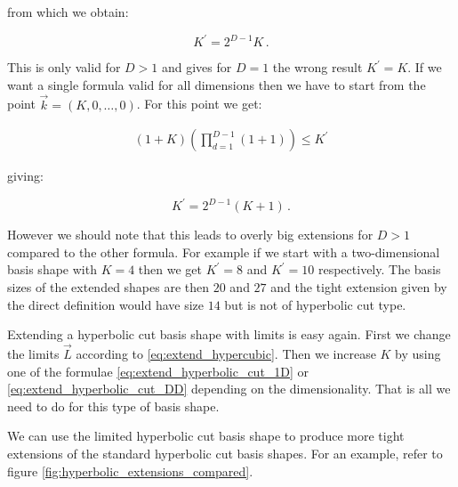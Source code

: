 from which we obtain:

\begin{equation} \label{eq:extend_hyperbolic_cut_DD}
  K^\prime = 2^{D-1} K \,.
\end{equation}

This is only valid for $D>1$ and gives for $D=1$ the wrong result $K^\prime = K$.
If we want a single formula valid for all dimensions then we have to start from
the point $\vec{k} = (K, 0, \ldots, 0)$. For this point we get:

\begin{align*}
  (1+K)\left(\prod_{d=1}^{D-1}(1+1)\right) \leq K^\prime
\end{align*}

giving:

\begin{equation} \label{eq:extend_hyperbolic_cut_general}
  K^\prime = 2^{D-1} (K+1) \,.
\end{equation}

However we should note that this leads to overly big extensions for $D>1$
compared to the other formula. For example if we start with a two-dimensional
basis shape with $K=4$ then we get $K^\prime = 8$ and $K^\prime = 10$ respectively.
The basis sizes of the extended shapes are then $20$ and $27$ and the tight extension
given by the direct definition would have size $14$ but is not of hyperbolic
cut type.

Extending a hyperbolic cut basis shape with limits is easy again. First we change
the limits $\vec{L}$ according to \eqref{eq:extend_hypercubic}. Then we increase $K$
by using one of the formulae \eqref{eq:extend_hyperbolic_cut_1D} or
\eqref{eq:extend_hyperbolic_cut_DD} depending on the dimensionality.
That is all we need to do for this type of basis shape.

We can use the limited hyperbolic cut basis shape to produce more tight extensions
of the standard hyperbolic cut basis shapes. For an example, refer to figure
\ref{fig:hyperbolic_extensions_compared}.

